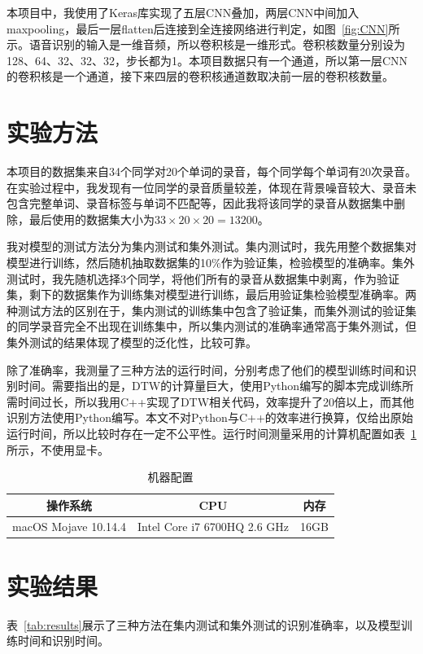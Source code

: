 \documentclass[UTF8]{article}
\begin{document}
本项目中，我使用了Keras库实现了五层CNN叠加，两层CNN中间加入maxpooling，最后一层flatten后连接到全连接网络进行判定，如图~\ref{fig:CNN}所示。语音识别的输入是一维音频，所以卷积核是一维形式。卷积核数量分别设为128、64、32、32、32，步长都为1。本项目数据只有一个通道，所以第一层CNN的卷积核是一个通道，接下来四层的卷积核通道数取决前一层的卷积核数量。

\section{实验方法}
本项目的数据集来自34个同学对20个单词的录音，每个同学每个单词有20次录音。在实验过程中，我发现有一位同学的录音质量较差，体现在背景噪音较大、录音未包含完整单词、录音标签与单词不匹配等，因此我将该同学的录音从数据集中删除，最后使用的数据集大小为$33 \times 20 \times 20=13200$。

我对模型的测试方法分为集内测试和集外测试。集内测试时，我先用整个数据集对模型进行训练，然后随机抽取数据集的10\%作为验证集，检验模型的准确率。集外测试时，我先随机选择3个同学，将他们所有的录音从数据集中剥离，作为验证集，剩下的数据集作为训练集对模型进行训练，最后用验证集检验模型准确率。两种测试方法的区别在于，集内测试的训练集中包含了验证集，而集外测试的验证集的同学录音完全不出现在训练集中，所以集内测试的准确率通常高于集外测试，但集外测试的结果体现了模型的泛化性，比较可靠。

除了准确率，我测量了三种方法的运行时间，分别考虑了他们的模型训练时间和识别时间。需要指出的是，DTW的计算量巨大，使用Python编写的脚本完成训练所需时间过长，所以我用C++实现了DTW相关代码，效率提升了20倍以上，而其他识别方法使用Python编写。本文不对Python与C++的效率进行换算，仅给出原始运行时间，所以比较时存在一定不公平性。运行时间测量采用的计算机配置如表~\ref{tab:machine}所示，不使用显卡。

\begin{table}[htbp]
	\centering
	\begin{tabular}{|c|c|c|}
		\hline
		\textbf{操作系统} & \textbf{CPU}                 & \textbf{内存} \\
		\hline
		macOS Mojave 10.14.4  & Intel Core i7 6700HQ 2.6 GHz & 16GB            \\
		\hline
	\end{tabular}
	\caption{\label{tab:machine}机器配置}
\end{table}

\section{实验结果}
表~\ref{tab:results}展示了三种方法在集内测试和集外测试的识别准确率，以及模型训练时间和识别时间。
\end{document}
